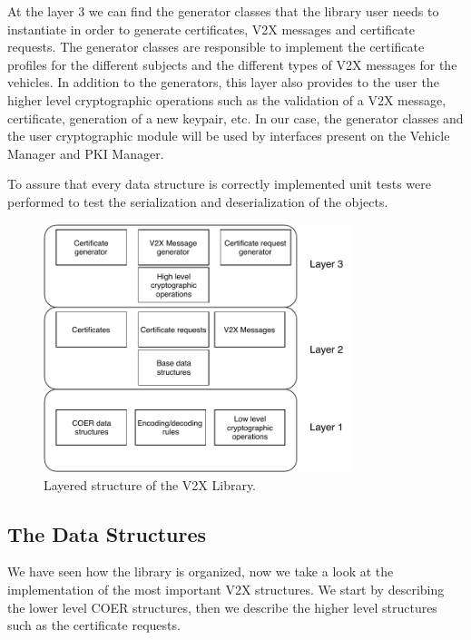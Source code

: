 At the layer 3 we can find the generator classes that the library user needs to instantiate in order to generate certificates, V2X messages and certificate requests. The generator classes are responsible to implement the certificate profiles for the different subjects and the different types of V2X messages for the vehicles. In addition to the generators, this layer also provides to the user the higher level cryptographic operations such as the validation of a V2X message, certificate, generation of a new keypair, etc. In our case, the generator classes and the user cryptographic module will be used by interfaces present on the Vehicle Manager and PKI Manager. 

To assure that every data structure is correctly implemented unit tests were performed to test the serialization and deserialization of the objects.

\begin{figure}
	\centering
	\includegraphics[width=0.8\textwidth]{Figures/v2xlib}
	\caption{\label{fig:v2x_arch} Layered structure of the V2X Library.}
\end{figure}

\subsection{The Data Structures}
We have seen how the library is organized, now we take a look at the implementation of the most important V2X structures. We start by describing the lower level COER structures, then we describe the higher level structures such as the certificate requests.

